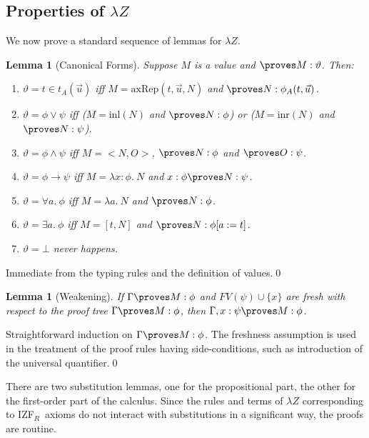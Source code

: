 \documentclass{LMCS}
\newtheorem{lemma}[thm]{Lemma}
\newcommand{\p}{\proves}
\newcommand{\g}{\Gamma}
\newcommand{\gp}{\Gamma \proves}
\newcommand{\pl}[1]{\ensuremath{\mathrm{#1}}}
\newcommand{\INL}{\pl{inl}}
\newcommand{\INR}{\pl{inr}}
\newcommand{\izfr}{IZF${}_R$}
\newcommand{\la}{\lambda Z}
\newcommand{\lz}{\lambda Z}
\begin{document}
\subsection{Properties of $\lz$}

We now prove a standard sequence of lemmas for $\la$. 

\begin{lemma}[Canonical Forms]
Suppose $M$ is a value and $\proves M : \vartheta$. Then: 
\begin{enumerate}[$\bullet$]
\item $\vartheta = t \in t_A(\vec{u})$ iff $M = \pl{axRep}(t, \vec{u}, N)$ and $\p N : \phi_A(t, \vec{u})$.
\item $\vartheta = \phi \lor \psi$ iff  ($M = \INL(N)$ and $\p N : \phi$) or ($M =
\INR(N)$ and $\p N : \psi$).
\item $\vartheta = \phi \land \psi$ iff $M = <N, O>$, $\p N : \phi$ and $\p
O : \psi$. 
\item $\vartheta = \phi \to \psi$ iff $M = \lambda x : \phi.\ N$ and $x :
\phi \p N : \psi$. 
\item $\vartheta = \forall a.\ \phi$ iff $M = \lambda a.\ N$ and $\p N :
\phi$.
\item $\vartheta = \exists a.\ \phi$ iff $M = [t, N]$ and $\p N : \phi[a:=t]$.
\item $\vartheta = \bot$ never happens.
\end{enumerate}
\end{lemma}
\proof Immediate from the typing rules and the definition of values.\qed


\begin{lemma}[Weakening]
If $\gp M : \phi$ and $FV(\psi) \cup \{ x \}$ are fresh with respect to the proof tree $\gp M : \phi$, then $\g, x : \psi \p M : \phi$.
\end{lemma}
\proof Straightforward induction on $\gp M : \phi$. The freshness assumption is
used in the treatment of the proof rules having side-conditions, such as 
introduction of the universal quantifier.\qed


There are two substitution lemmas, one for the propositional part, the other
for the first-order part of the calculus. Since the rules and terms of $\lz$
corresponding to \izfr\ axioms do not interact with substitutions in a
significant way, the proofs are routine. 
\end{document}
